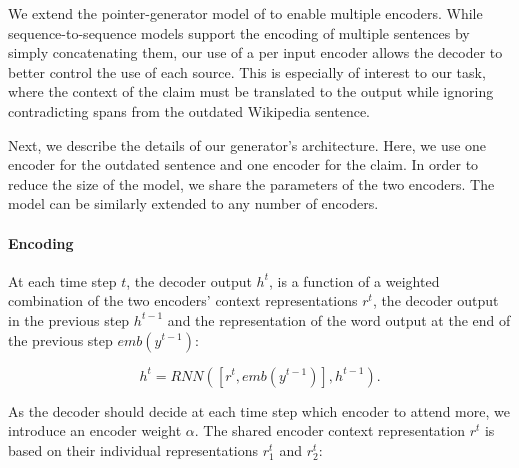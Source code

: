 \documentclass[letterpaper]{article} %
\begin{document}
We extend the pointer-generator model of \cite{pointer-generator} to enable multiple encoders. While sequence-to-sequence models support the encoding of multiple sentences by simply concatenating them, our use of a per input encoder allows the decoder to better control the use of each source. This is especially of interest to our task, where the context of the claim must be translated to the output while ignoring contradicting spans from the outdated Wikipedia sentence.

Next, we describe the details of our generator's architecture. Here, we use one encoder for the outdated sentence and one encoder for the claim. In order to reduce the size of the model, we share the parameters of the two encoders. The model can be similarly extended to any number of encoders.



\paragraph{Encoding}
At each time step $t$, the decoder output $h^t$, is a function of a weighted combination of the two encoders' context representations $r^{t}$, the decoder output in the previous step $h^{t-1}$ and the representation of the word output at the end of the previous step $emb(y^{t-1})$:

\begin{equation}
    h^t = \textit{RNN}([r^t, emb(y^{t-1})], h^{t-1}).
    \label{eq:decoder}
\end{equation}

As the decoder should decide at each time step which encoder to attend more, we introduce an encoder weight $\alpha$. The shared encoder context representation $r^t$ is based on their individual representations $r^t_1$ and $r^t_2$:
\end{document}
